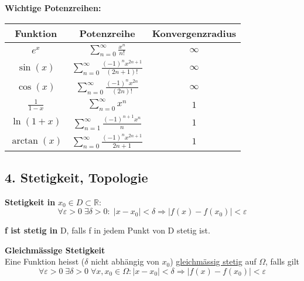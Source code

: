 \textbf{Wichtige Potenzreihen:}
\begin{tabular}{|c|c|c|}
\hline
Funktion & Potenzreihe & Konvergenzradius \\
\hline
\( e^x \) & \( \sum\limits_{n=0}^\infty \frac{x^n}{n!} \) & \( \infty \) \\
\hline
\( \sin(x) \) & \( \sum\limits_{n=0}^\infty \frac{(-1)^n x^{2n+1}}{(2n+1)!} \) & \( \infty \) \\
\hline
\( \cos(x) \) & \( \sum\limits_{n=0}^\infty \frac{(-1)^n x^{2n}}{(2n)!} \) & \( \infty \) \\
\hline
\( \frac{1}{1 - x} \) & \( \sum\limits_{n=0}^\infty x^n \) & \( 1 \) \\
\hline
\( \ln(1 + x) \) & \( \sum\limits_{n=1}^\infty \frac{(-1)^{n+1} x^n}{n} \) & \( 1 \) \\
\hline
\( \arctan(x) \) & \( \sum\limits_{n=0}^\infty \frac{(-1)^n x^{2n+1}}{2n+1} \) & \( 1 \) \\
\hline
\end{tabular}



\subsection{4. Stetigkeit, Topologie}
\textbf{Stetigkeit in } $x_0 \in D \subset \mathbb{R}$:  
\[
\forall \varepsilon > 0\; \exists \delta > 0:\; |x - x_0| < \delta \Rightarrow |f(x) - f(x_0)| < \varepsilon
\]

\textbf{f ist stetig in } D, falls f in jedem Punkt von D stetig ist.

\textbf{Gleichmässige Stetigkeit}\\
Eine Funktion heisst ($\delta$ nicht abhängig von $x_0$) \uline{gleichmässig stetig} auf $\Omega$, falls gilt
\[
\forall \varepsilon > 0 \; \exists \delta > 0 \; \forall x, x_0 \in \Omega : |x - x_0| < \delta \Rightarrow |f(x) - f(x_0)| < \varepsilon
\]

